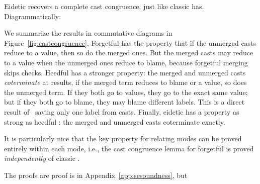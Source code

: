 \documentclass[9pt]{extarticle}
\newcommand{\ottnt}[1]{\mathit{#1}}
\begin{document}
{\ifpopl
  Eidetic \lambdah recovers a complete cast congruence, just like
  classic \lambdah has. Diagrammatically: 
\vspace*{-1em}
\begin{center}
\end{center}
\else
We summarize the results in commutative diagrams in
Figure~\ref{fig:castcongruence}.
Forgetful \lambdah has the property that if the unmerged casts reduce
to a value, then so do the merged ones. But the merged casts may
reduce to a value when the unmerged ones reduce to blame, because
forgetful merging skips checks.
Heedful \lambdah has a stronger property: the merged and unmerged
casts \textit{coterminate} at results, if the merged term reduces to
blame or a value, so does the unmerged term. If they both go to
values, they go to the exact same value; but if they both go to blame,
they may blame different labels. This is a direct result of
\ECastMerge\ saving only one label from casts.
Finally, eidetic \lambdah has a property as strong as heedful
\lambdah: the merged and unmerged casts coterminate exactly.

It is particularly nice that the key property for relating modes can
be proved entirely within each mode, i.e., the cast congruence lemma
for forgetful \lambdah is proved \textit{independently} of classic
\lambdah.

\fi}
The \iffull proofs are \else proof is \fi{} in Appendix~\ref{app:sesoundness}, but
\end{document}
